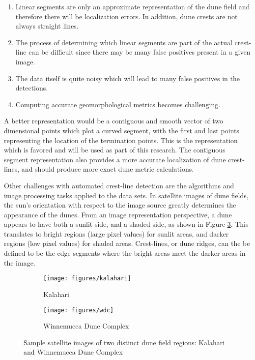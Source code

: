 \begin{enumerate}
	\item Linear segments are only an approximate representation of the dune field and therefore there will be localization errors. In addition, dune crests are not always straight lines.
	\item The process of determining which linear segments are part of the actual crest-line can be difficult since there may be many false positives present in a given image.
	\item The data itself is quite noisy which will lead to many false positives in the detections.
	\item Computing accurate geomorphological metrics becomes challenging.
\end{enumerate}

A better representation would be a contiguous and smooth vector of two dimensional points which plot a curved segment, with the first and last points representing the location of the termination points. This is the representation which is favored and will be used as part of this research. The contiguous segment representation also provides a more accurate localization of dune crest-lines, and should produce more exact dune metric calculations.

Other challenges with automated crest-line detection are the algorithms and image processing tasks applied to the data sets. In satellite images of dune fields, the sun's orientation with respect to the image source greatly determines the appearance of the dunes. From an image representation perspective, a dune appears to have both a sunlit side, and a shaded side, as shown in Figure \ref{fig:intro_sample_images}. This translates to bright regions (large pixel values) for sunlit areas, and darker regions (low pixel values) for shaded areas. Crest-lines, or dune ridges, can the be defined to be the edge segments where the bright areas meet the darker areas in the image.

\begin{figure}
	\centering
	\begin{subfigure}{0.45\textwidth}
		\centering
		\texttt{[image: figures/kalahari]}
		\caption{ Kalahari }
		\label{fig:intro_kalahari_image}
	\end{subfigure}
	\begin{subfigure}{0.45\textwidth}
		\centering
		\texttt{[image: figures/wdc]}
		\caption{ Winnemucca Dune Complex }
		\label{fig:intro_wdc_image}
	\end{subfigure}
	\caption{Sample satellite images of two distinct dune field regions: Kalahari and  Winnemucca Dune Complex }
	\label{fig:intro_sample_images}
\end{figure}

